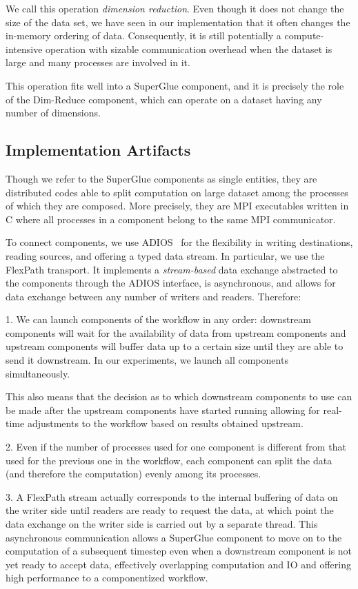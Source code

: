 We call this operation {\em dimension reduction}.
Even though it does not
change the size of the data set, we have seen in our implementation 
that it often changes the in-memory
ordering of data. Consequently, it is still potentially a
compute-intensive operation with sizable communication overhead
when the dataset is large and many
processes are involved in it.

This operation fits well into a
SuperGlue component, and it is precisely
the role of the Dim-Reduce
component, which can operate on a dataset having
any number of dimensions.

\subsection{Implementation Artifacts}

Though we refer to the SuperGlue components as single entities,
they are distributed
codes able to split computation on large dataset
among the processes of which they are
composed. More precisely, they are MPI executables written in C
where all processes in a component belong to the
same MPI communicator.

To connect components, we use
ADIOS~\cite{lofstead:2009:adaptable}
for the flexibility in writing destinations,
reading sources, and offering a
typed data stream. In particular, we use
the FlexPath transport. It implements
a {\em stream-based} data exchange abstracted to
the components through the
ADIOS interface, is asynchronous, and allows for
data exchange between any
number of writers and readers. Therefore:

1. We can launch components of the workflow
in any order: downstream components
will wait for the availability of data from
upstream components and upstream
components will buffer data up to a certain
size until they are able to send it
downstream. In our experiments,
we launch all components simultaneously.

This also means that the decision as to
which downstream components to use can be made after
the upstream components have started
running allowing for real-time adjustments to the
workflow based on results obtained upstream.
\fi

2. Even if the number of processes used for one
component is different from that used for the previous
one in the workflow, each component can split the data
(and therefore the computation) evenly among its processes.

3. A FlexPath stream actually corresponds
to the internal buffering of data on the writer side
until readers are ready to request the data,
at which point the data exchange
on the writer side is carried out
by a separate thread.
This asynchronous communication allows a 
SuperGlue component to move on to the computation
of a subsequent timestep even when a downstream
component is not yet ready to accept data,
effectively overlapping computation and IO
and offering high performance to a componentized workflow.

